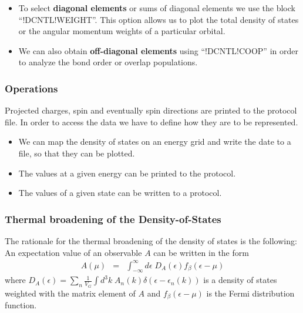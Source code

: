 \documentclass[final,12pt]{article}
\begin{document}
{{{{{{\begin{itemize}

\item To select {\bf diagonal elements} or sums of diagonal elements we use
  the block ``!DCNTL!WEIGHT''. This option allows us to plot the
  total density of states or the angular momentum weights of a
  particular orbital.

\item We can also obtain {\bf off-diagonal elements} using
  ``!DCNTL!COOP'' in order to analyze the bond order or overlap
  populations.

\end{itemize}

\subsubsection{Operations}
Projected charges, spin and eventually spin directions are printed to
the protocol file.  In order to access the data we have to define how
they are to be represented.
\begin{itemize}
\item We can map the density of states on an energy grid and write the
date to a file, so that they can be plotted.
\item The values at a given energy can be printed to the protocol.
\item The values of a given state can be written to a protocol.
\end{itemize}

\subsubsection{Thermal broadening of the Density-of-States}
\label{sec:thermalbroadening}
The rationale for the thermal broadening of the density of states is
the following: An expectation value of an observable $A$ can be
written in the form
\begin{eqnarray}
A(\mu)&=&\int_{-\infty}^\infty d\epsilon\; D_A(\epsilon) f_\beta(\epsilon-\mu)
\label{eq:aofmu}
\end{eqnarray}
where $D_A(\epsilon)=\sum_n\frac{1}{V_G}\int d^3k\;
A_n(k)\delta(\epsilon-\epsilon_n(k))$ is a density of states
weighted with the matrix element of $A$ and $f_{\beta}(\epsilon-\mu)$
is the Fermi distribution function.

}}}}}}
\end{document}
